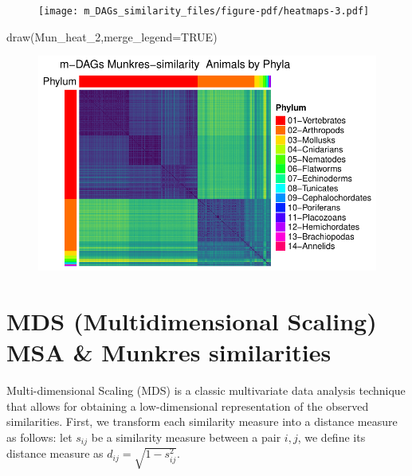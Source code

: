 \documentclass[
  letterpaper,
  DIV=11,
  numbers=noendperiod]{scrreprt}
\newenvironment{Shaded}{}{}
\newcommand{\AttributeTok}[1]{\textcolor[rgb]{0.78,0.47,0.87}{#1}}
\newcommand{\ConstantTok}[1]{\textcolor[rgb]{0.82,0.60,0.40}{#1}}
\newcommand{\FunctionTok}[1]{\textcolor[rgb]{0.38,0.69,0.94}{#1}}
\newcommand{\NormalTok}[1]{\textcolor[rgb]{0.67,0.70,0.75}{#1}}
\begin{document}
\begin{figure}[H]

{\centering \texttt{[image: m\_DAGs\_similarity\_files/figure-pdf/heatmaps-3.pdf]}

}

\end{figure}

\begin{Shaded}
\begin{Highlighting}[]
\FunctionTok{draw}\NormalTok{(Mun\_heat\_2,}\AttributeTok{merge\_legend=}\ConstantTok{TRUE}\NormalTok{)}
\end{Highlighting}
\end{Shaded}

\begin{figure}[H]

{\centering \includegraphics[width=1\textwidth,height=\textheight]{m_DAGs_similarity_files/figure-pdf/heatmaps-4.pdf}

}

\end{figure}

\hypertarget{mds-multidimensional-scaling-msa-munkres-similarities}{%
\section{MDS (Multidimensional Scaling) MSA \& Munkres
similarities}\label{mds-multidimensional-scaling-msa-munkres-similarities}}

Multi-dimensional Scaling (MDS) is a classic multivariate data analysis
technique that allows for obtaining a low-dimensional representation of
the observed similarities. First, we transform each similarity measure
into a distance measure as follows: let \(s_{ij}\) be a similarity
measure between a pair \(i,j\), we define its distance measure as
\(d_{ij}=\sqrt{1-s_{ij}^2}\).
\end{document}
